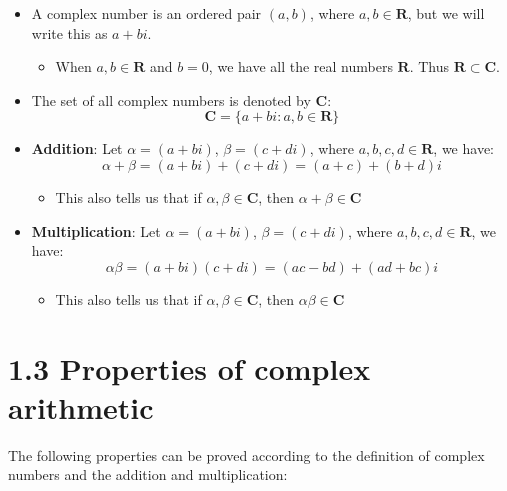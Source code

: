 \documentclass[12pt, letterpaper, oneside]{book}
\begin{document}
\begin{itemize}
  \item A complex number is an ordered pair $(a, b)$, where $a, b \in
    \mathbf{R}$, but we will write this as $a + bi$.
    \begin{itemize}
      \item When $a, b \in \mathbf{R}$ and $b = 0$, we have all the real
        numbers $\mathbf{R}$. Thus $\mathbf{R} \subset \mathbf{C}$.
    \end{itemize}
  \item The set of all complex numbers is denoted by $\mathbf{C}$:
    \[ \mathbf{C} = \{a + bi: a, b \in \mathbf{R}\} \]
  \item \textbf{Addition}: Let $\alpha = (a + bi)$, $\beta = (c + di)$, where
    $a, b, c, d \in \mathbf{R}$, we have:
    \[ \alpha + \beta = (a + bi) + (c + di) = (a + c) + (b + d)i \]
    \begin{itemize}
      \item This also tells us that if $\alpha, \beta \in \mathbf{C}$, then
        $\alpha + \beta \in \mathbf{C}$
    \end{itemize}
  \item \textbf{Multiplication}: Let $\alpha = (a + bi)$, $\beta = (c + di)$,
    where $a, b, c, d \in \mathbf{R}$, we have:
    \[ \alpha\beta = (a + bi)(c + di) = (ac - bd) + (ad + bc)i \]
    \begin{itemize}
      \item This also tells us that if $\alpha, \beta \in \mathbf{C}$, then
        $\alpha\beta \in \mathbf{C}$
    \end{itemize}
\end{itemize}

\section*{1.3 Properties of complex arithmetic}

The following properties can be proved according to the definition of complex
numbers and the addition and multiplication:
\end{document}
